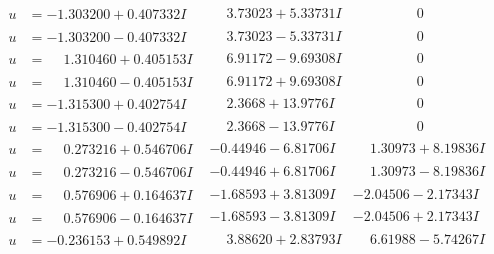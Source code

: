\documentclass[1p]{elsarticle_modified}
\theoremstyle{definition}
\begin{document}
$$\begin{array}{c|c|c}
\begin{aligned}
u &= -1.303200 + 0.407332 I\end{aligned}
 & \phantom{-}3.73023 + 5.33731 I & \phantom{-0.000000 } 0 \\ \hline\begin{aligned}
u &= -1.303200 - 0.407332 I\end{aligned}
 & \phantom{-}3.73023 - 5.33731 I & \phantom{-0.000000 } 0 \\ \hline\begin{aligned}
u &= \phantom{-}1.310460 + 0.405153 I\end{aligned}
 & \phantom{-}6.91172 - 9.69308 I & \phantom{-0.000000 } 0 \\ \hline\begin{aligned}
u &= \phantom{-}1.310460 - 0.405153 I\end{aligned}
 & \phantom{-}6.91172 + 9.69308 I & \phantom{-0.000000 } 0 \\ \hline\begin{aligned}
u &= -1.315300 + 0.402754 I\end{aligned}
 & \phantom{-}2.3668 + 13.9776 I & \phantom{-0.000000 } 0 \\ \hline\begin{aligned}
u &= -1.315300 - 0.402754 I\end{aligned}
 & \phantom{-}2.3668 - 13.9776 I & \phantom{-0.000000 } 0 \\ \hline\begin{aligned}
u &= \phantom{-}0.273216 + 0.546706 I\end{aligned}
 & -0.44946 - 6.81706 I & \phantom{-}1.30973 + 8.19836 I \\ \hline\begin{aligned}
u &= \phantom{-}0.273216 - 0.546706 I\end{aligned}
 & -0.44946 + 6.81706 I & \phantom{-}1.30973 - 8.19836 I \\ \hline\begin{aligned}
u &= \phantom{-}0.576906 + 0.164637 I\end{aligned}
 & -1.68593 + 3.81309 I & -2.04506 - 2.17343 I \\ \hline\begin{aligned}
u &= \phantom{-}0.576906 - 0.164637 I\end{aligned}
 & -1.68593 - 3.81309 I & -2.04506 + 2.17343 I \\ \hline\begin{aligned}
u &= -0.236153 + 0.549892 I\end{aligned}
 & \phantom{-}3.88620 + 2.83793 I & \phantom{-}6.61988 - 5.74267 I \\ \hline\begin{aligned}

\end{aligned}
\end{array}$$
\end{document}
